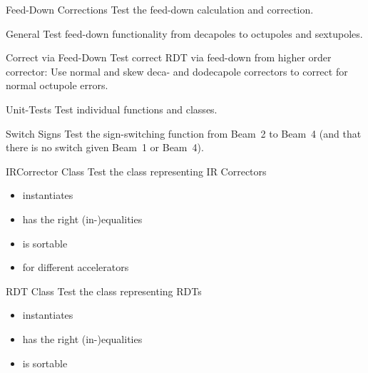 \begin{testlist}
\begin{testlist}
    \end{testlist}
\item[Feed-Down Corrections] Test the feed-down calculation and correction.
    \begin{testlist}
        \item[General] Test feed-down functionality from decapoles to octupoles and sextupoles.
        \item[Correct via Feed-Down] Test correct RDT via feed-down from higher order corrector: 
        Use normal and skew deca- and dodecapole correctors to correct for normal octupole errors.
    \end{testlist}
\item[Unit-Tests] Test individual functions and classes.
    \begin{testlist}
        \item[Switch Signs] Test the sign-switching function from Beam~2 to Beam~4 (and that there is no switch given Beam~1 or Beam~4).
        \item[IRCorrector Class] Test the class representing IR Correctors
        \begin{itemize}
            \item instantiates
            \item has the right (in-)equalities 
            \item is sortable
            \item for different accelerators
        \end{itemize}
        \item[RDT Class] Test the class representing RDTs
        \begin{itemize}
            \item instantiates
            \item has the right (in-)equalities 
            \item is sortable
        \end{itemize}
    \end{testlist}
\end{testlist}


